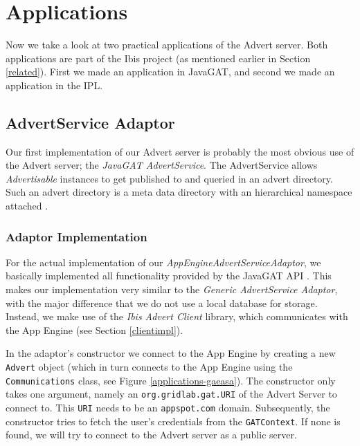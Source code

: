 \section{Applications}
\label{applications}
Now we take a look at two practical applications of the Advert server. Both
applications are part of the Ibis project (as mentioned earlier in Section
\ref{related}). First we made an application in JavaGAT, and second we made an
application in the IPL.

\subsection{AdvertService Adaptor}
\label{applications-advertservice}
Our first implementation of our Advert server is probably the most obvious use
of the Advert server; the \emph{JavaGAT AdvertService}. The AdvertService
allows \emph{Advertisable} instances to get published to and queried in an
advert directory. Such an advert directory is a meta data directory with an
hierarchical namespace attached \cite{javagat-javadoc}.

\subsubsection{Adaptor Implementation}
For the actual implementation of our \emph{AppEngineAdvertServiceAdaptor}, we
basically implemented all functionality provided by the JavaGAT API
\cite{javagat-javadoc}. This makes our implementation very similar to the
\emph{Generic AdvertService Adaptor}, with the major difference that we do not
use a local database for storage. Instead, we make use of the \emph{Ibis Advert
Client} library, which communicates with the App Engine (see Section 
\ref{clientimpl}). 

In the adaptor's constructor we connect to the App Engine by creating a new
\texttt{Advert} object (which in turn connects to the App Engine using the
\texttt{Communications} class, see Figure \ref{applications-gaeasa}). The
constructor only takes one argument, namely an \texttt{org.gridlab.gat.URI} of
the Advert Server to connect to. This \texttt{URI} needs to be an
\texttt{appspot.com} domain. Subsequently, the constructor tries to fetch the
user's credentials from the \texttt{GATContext}. If none is found, we will try to
connect to the Advert server as a public server.

